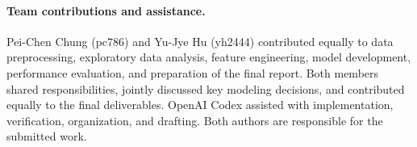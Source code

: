 \paragraph{Team contributions and assistance.}
Pei-Chen Chung (pc786) and Yu-Jye Hu (yh2444) contributed equally to data preprocessing,
exploratory data analysis, feature engineering, model development, performance evaluation,
and preparation of the final report. Both members shared responsibilities, jointly discussed
key modeling decisions, and contributed equally to the final deliverables. OpenAI Codex
assisted with implementation, verification, organization, and drafting. Both authors are
responsible for the submitted work.
